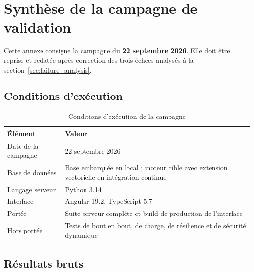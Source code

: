\chapter{Synthèse de la campagne de validation}
\label{app:validation_campaign}

Cette annexe consigne la campagne du \textbf{22 septembre 2026}. Elle doit être
reprise et redatée après correction des trois échecs analysés à la
section~\ref{sec:failure_analysis}.

\section{Conditions d'exécution}

\begin{table}[htbp]
  \centering
  \caption{Conditions d'exécution de la campagne}
  \label{tab:campaign_conditions}
  \begin{tabularx}{\textwidth}{L{4.0cm} X}
    \toprule
    \textbf{Élément} & \textbf{Valeur} \\
    \midrule
    Date de la campagne   & 22 septembre 2026 \\
    Base de données       & Base embarquée en local ; moteur cible avec extension vectorielle en intégration continue \\
    Langage serveur       & Python 3.14 \\
    Interface             & Angular 19.2, TypeScript 5.7 \\
    Portée                & Suite serveur complète et build de production de l'interface \\
    Hors portée           & Tests de bout en bout, de charge, de résilience et de sécurité dynamique \\
    \bottomrule
  \end{tabularx}
\end{table}

\section{Résultats bruts}

